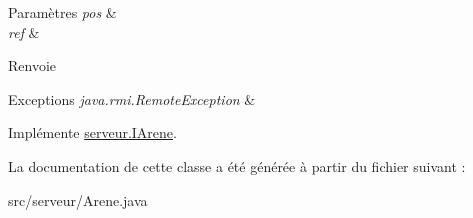 \begin{DoxyParams}{Paramètres}
{\em pos} & \\
\hline
{\em ref} & \\
\hline
\end{DoxyParams}
\begin{DoxyReturn}{Renvoie}

\end{DoxyReturn}

\begin{DoxyExceptions}{Exceptions}
{\em java.\-rmi.\-Remote\-Exception} & \\
\hline
\end{DoxyExceptions}


Implémente \hyperlink{interfaceserveur_1_1_i_arene_a47a37dbadfd6418b184e2c9f41faec01}{serveur.\-I\-Arene}.



La documentation de cette classe a été générée à partir du fichier suivant \-:\begin{DoxyCompactItemize}
\item 
src/serveur/Arene.\-java\end{DoxyCompactItemize}
